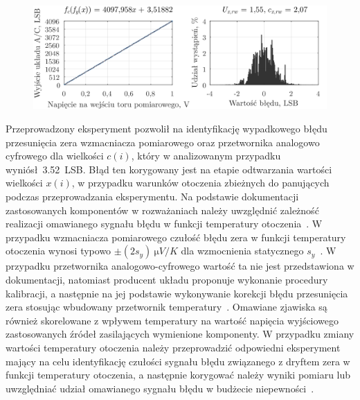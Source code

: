 \begin{figure}[htb!]
\begin{center}
\includegraphics{obrazki/static_adcout}
\end{center}
\end{figure}

Przeprowadzony eksperyment pozwolił na identyfikację wypadkowego błędu przesunięcia zera wzmacniacza pomiarowego oraz przetwornika analogowo cyfrowego dla wielkości $c(i)$, który w analizowanym przypadku wyniósł~\qty{3.52}{LSB}. Błąd ten korygowany jest na etapie odtwarzania wartości wielkości $x(i)$, w przypadku warunków otoczenia zbieżnych do panujących podczas przeprowadzania eksperymentu. Na podstawie dokumentacji zastosowanych komponentów w rozważaniach należy uwzględnić zależność realizacji omawianego sygnału błędu w funkcji temperatury otoczenia~\cite{microchip_manual, stm_f411, diodes_manual, stm_manual}. W przypadku wzmacniacza pomiarowego czułość błędu zera w funkcji temperatury otoczenia wynosi typowo $\pm (2 s_{y})~\unit{\micro V \per K}$ dla wzmocnienia statycznego $s_{y}$~\cite{microchip_manual}. W przypadku przetwornika analogowo-cyfrowego wartość ta nie jest przedstawiona w dokumentacji, natomiast producent układu proponuje wykonanie procedury kalibracji, a następnie na jej podstawie wykonywanie korekcji błędu przesunięcia zera stosując wbudowany przetwornik temperatury~\cite{stm_adc}. Omawiane zjawiska są również skorelowane z wpływem temperatury na wartość napięcia wyjściowego zastosowanych źródeł zasilających wymienione komponenty. W przypadku zmiany wartości temperatury otoczenia należy przeprowadzić odpowiedni eksperyment mający na celu identyfikację czułości sygnału błędu związanego z dryftem zera w funkcji temperatury otoczenia, a następnie korygować należy wyniki pomiaru lub uwzględniać udział omawianego sygnału błędu w budżecie niepewności~\cite{jcgm_guide}.


